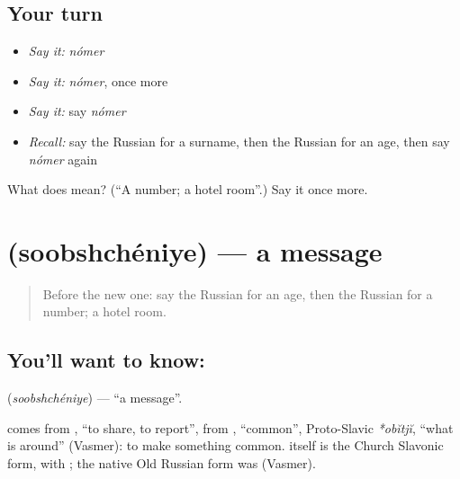 \subsection*{Your turn}
\begin{itemize}
\raggedright
  \item \emph{Say it:} \emph{nómer}
  \item \emph{Say it:} \emph{nómer}, once more
  \item \emph{Say it:} say \emph{nómer}
  \item \emph{Recall:} say the Russian for a surname, then the Russian for an age, then say \emph{nómer} again
\end{itemize}

\begin{tcolorbox}[breakable,colback=teal!4,colframe=teal!35!black,title={Before you move on}]
What does  mean? (\textquotedblleft{}A number; a hotel room\textquotedblright{}.) Say it once more.
\end{tcolorbox}
\section[\texorpdfstring{\ru{сообщение} (soobshchéniye)}{сообщение (soobshchéniye)}]{ (soobshchéniye) — a message}

\label{lesson:RU-C255-soobshcheniye}



\begin{quote}
Before the new one: say the Russian for an age, then the Russian for a number; a hotel room.
\end{quote}

\subsection*{You'll want to know: }
\textbf{} (\emph{soobshchéniye}) — \textquotedblleft{}a message\textquotedblright{}.

\begin{cousinweb}
\textbf{} comes from \emph{}, \textquotedblleft{}to share, to report\textquotedblright{}, from \emph{}, \textquotedblleft{}common\textquotedblright{}, Proto-Slavic \emph{*obĭtjĭ}, \textquotedblleft{}what is around\textquotedblright{} (Vasmer): to make something common. \emph{} itself is the Church Slavonic form, with \emph{}; the native Old Russian form was \emph{} (Vasmer).
\end{cousinweb}

